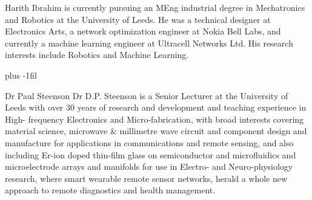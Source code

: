 \documentclass[lettersize,journal]{IEEEtran}
\begin{document}
\begin{IEEEbiography}{Harith Ibrahim} is currently pursuing an MEng industrial degree in Mechatronics and Robotics at the University of Leeds. He was a technical designer at Electronics Arts, a network optimization engineer at Nokia Bell Labs, and currently a machine learning engineer at Ultracell Networks Ltd. His research interests include Robotics and Machine Learning.
\end{IEEEbiography}

\baselineskip plus -1fil

\begin{IEEEbiography}{Dr Paul Steenson} Dr D.P. Steenson is a Senior Lecturer at the University of Leeds with over 30 years of research and development and teaching experience in High- frequency Electronics and Micro-fabrication, with broad interests covering material science, microwave \& millimetre wave circuit and component design and manufacture for applications in communications and remote sensing, and also including Er-ion doped thin-film glass on semiconductor and microfluidics and microelectrode arrays and manifolds for use in Electro- and Neuro-physiology research, where smart wearable remote sensor networks, herald a whole new approach to remote diagnostics and health management. 
\end{IEEEbiography}



\vfill
\end{document}

